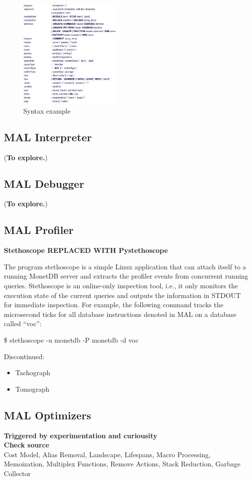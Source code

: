 \documentclass[11pt]{article}
\begin{document}
\begin{figure}[htbp]
\centering
\includegraphics[width=2.0in]{./Pictures/syntax.png}
\caption{\label{fig:org2aae521}
Syntax example}
\end{figure}

\subsection{MAL Interpreter}
\label{sec:orgc70a39b}
(\textbf{To explore.})

\subsection{MAL Debugger}
\label{sec:org2e426fa}
(\textbf{To explore.})

\subsection{MAL Profiler}
\label{sec:org41867fc}

\textbf{Stethoscope REPLACED WITH Pystethoscope}

The program stethoscope is a simple Linux application that can attach itself to a running MonetDB server and extracts
the profiler events from concurrent running queries. Stethoscope is an online-only inspection tool, i.e., it only
monitors the execution state of the current queries and outputs the information in STDOUT for immediate inspection.
For example, the following command tracks the microsecond ticks for all database instructions denoted in MAL on a database called “voc”:

\$ stethoscope -u monetdb -P monetdb -d voc

Discontinued:
\begin{itemize}
\item Tachograph
\item Tomograph
\end{itemize}

\subsection{MAL Optimizers}
\label{sec:orgb48d3c8}
\textbf{Triggered by experimentation and curiousity}\\
\textbf{Check source}\\
 Cost Model, Alias Removal, Landscape, Lifespans, Macro Processing, Memoization, Multiplex Functions, Remove Actions, Stack Reduction, Garbage Collector
\end{document}

